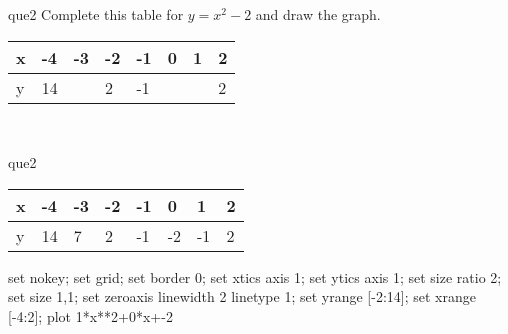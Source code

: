 \documentclass[13.5pt, varwidth=true]{beamer}
\begin{document}
\begin{frame}[shrink=19,fragile]
	\begin{beamercolorbox}[rounded=true, left, shadow=true,wd=14.8cm]{que2}
		 Complete this table for $y = x^{2} - 2$ and draw the graph. \\[0.3cm] \renewcommand{\arraystretch}{1.2}\begin{tabular}{|C|C|C|C|C|C|C|C|} \hline x & -4 & -3 & -2 & -1 & 0 & 1 & 2 \\ \hline y & 14 &  & 2 & -1 &  &  & 2\\ \hline \end{tabular}\\[0.3cm]
	\end{beamercolorbox}
\end{frame}
\begin{frame}[shrink=19,fragile]
	\begin{beamercolorbox}[rounded=true, left, shadow=true,wd=14.8cm]{que2}
		\renewcommand{\arraystretch}{1.2}\begin{tabular}{|C|C|C|C|C|C|C|C|} \hline x & -4 & -3 & -2 & -1 & 0 & 1 & 2 \\ \hline y & 14 & 7 & 2 & -1 & -2 & -1 & 2\\ \hline \end{tabular}\begin{gnuplot}[terminal=pdf] set nokey; set grid; set border 0; set xtics axis 1; set ytics axis 1; set size ratio 2; set size 1,1; set zeroaxis linewidth 2 linetype 1; set yrange [-2:14]; set xrange [-4:2]; plot 1*x**2+0*x+-2 \end{gnuplot}
	\end{beamercolorbox}
\end{frame}
\end{document}
